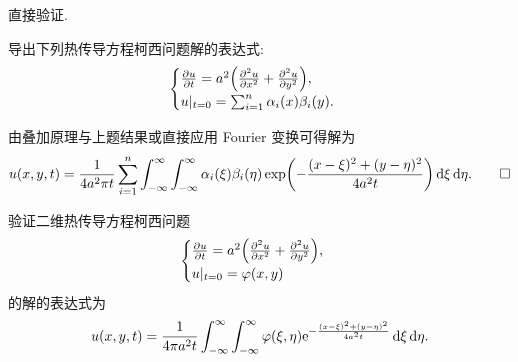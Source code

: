 \begin{solution}
  直接验证.
\end{solution}


\begin{exercise}[8]
  导出下列热传导方程柯西问题解的表达式:
  \[\begin{cases}
    \frac{\partial u}{\partial t} 
      = a^2\Bigl(\frac{\partial^2u}{\partial x^2} +
                  \frac{\partial^2u}{\partial y^2}\Bigr), \\
    u|_{t=0} = \sum_{i=1}^n \alpha_i(x)\beta_i(y).
  \end{cases}\]
\end{exercise}

\begin{solution}
  由叠加原理与上题结果或直接应用 Fourier 变换可得解为
  \[u(x,y,t) = \frac{1}{4a^2\pi t} \sum_{i=1}^n \int_{-\infty}^{\infty}
    \int_{-\infty}^{\infty} \alpha_i(\xi) \beta_i(\eta)
      \exp\biggl(-\frac{(x-\xi)^2+(y-\eta)^2}{4a^2 t}\biggr) \mathop{}\!\mathrm{d}\xi\mathop{}\!\mathrm{d}\eta.\qedhere\]
\end{solution}


\begin{exercise}[9]
  验证二维热传导方程柯西问题
  \[\begin{cases}
    \frac{\partial u}{\partial t} = a^2 
      \Bigl(\frac{\partial^2 u}{\partial x^2} + \frac{\partial^2 u}{\partial y^2}\Bigr), \\
    u|_{t=0} = \varphi(x,y)
  \end{cases}\]
  的解的表达式为
  \[u(x,y,t) = \frac{1}{4\pi a^2t} \int_{-\infty}^{\infty}
    \int_{-\infty}^{\infty} \varphi(\xi,\eta) \mathrm{e}^{-\frac{(x-\xi)^2+(y-\eta)^2}{4a^2t}}
    \mathop{}\!\mathrm{d}\xi\mathop{}\!\mathrm{d}\eta.\]
\end{exercise}

